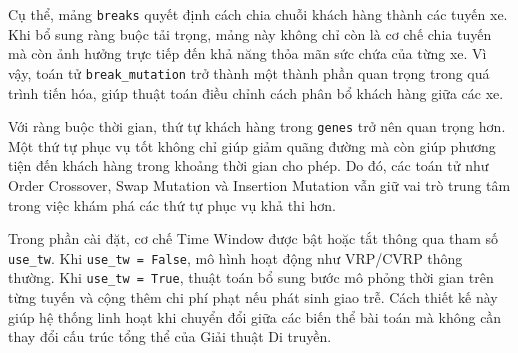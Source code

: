 \documentclass[12pt,a4paper]{article}
\numberwithin{figure}{subsection}
\begin{document}
Cụ thể, mảng \texttt{breaks} quyết định cách chia chuỗi khách hàng thành các tuyến xe. Khi bổ sung ràng buộc tải trọng, mảng này không chỉ còn là cơ chế chia tuyến mà còn ảnh hưởng trực tiếp đến khả năng thỏa mãn sức chứa của từng xe. Vì vậy, toán tử \texttt{break\_mutation} trở thành một thành phần quan trọng trong quá trình tiến hóa, giúp thuật toán điều chỉnh cách phân bổ khách hàng giữa các xe.

Với ràng buộc thời gian, thứ tự khách hàng trong \texttt{genes} trở nên quan trọng hơn. Một thứ tự phục vụ tốt không chỉ giúp giảm quãng đường mà còn giúp phương tiện đến khách hàng trong khoảng thời gian cho phép. Do đó, các toán tử như Order Crossover, Swap Mutation và Insertion Mutation vẫn giữ vai trò trung tâm trong việc khám phá các thứ tự phục vụ khả thi hơn.

Trong phần cài đặt, cơ chế Time Window được bật hoặc tắt thông qua tham số \texttt{use\_tw}. Khi \texttt{use\_tw = False}, mô hình hoạt động như VRP/CVRP thông thường. Khi \texttt{use\_tw = True}, thuật toán bổ sung bước mô phỏng thời gian trên từng tuyến và cộng thêm chi phí phạt nếu phát sinh giao trễ. Cách thiết kế này giúp hệ thống linh hoạt khi chuyển đổi giữa các biến thể bài toán mà không cần thay đổi cấu trúc tổng thể của Giải thuật Di truyền.
\end{document}
